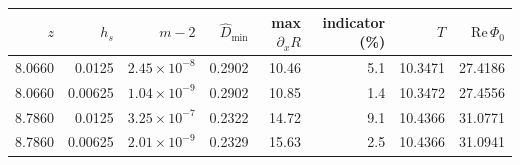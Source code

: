 \begin{tabular}{rrrrrrrr}
\toprule
$z$ & $h_s$ & $m-2$ & $\hat D_{\min}$ & max $\partial_xR$ & indicator (\%) & $T$ & $\mathrm{Re}\,\Phi_0$\\
\midrule
8.0660 & 0.0125 & $2.45\times10^{-8}$ & 0.2902 & 10.46 & 5.1 & 10.3471 & 27.4186\\
8.0660 & 0.00625 & $1.04\times10^{-9}$ & 0.2902 & 10.85 & 1.4 & 10.3472 & 27.4556\\
8.7860 & 0.0125 & $3.25\times10^{-7}$ & 0.2322 & 14.72 & 9.1 & 10.4366 & 31.0771\\
8.7860 & 0.00625 & $2.01\times10^{-9}$ & 0.2329 & 15.63 & 2.5 & 10.4366 & 31.0941\\
\bottomrule
\end{tabular}
